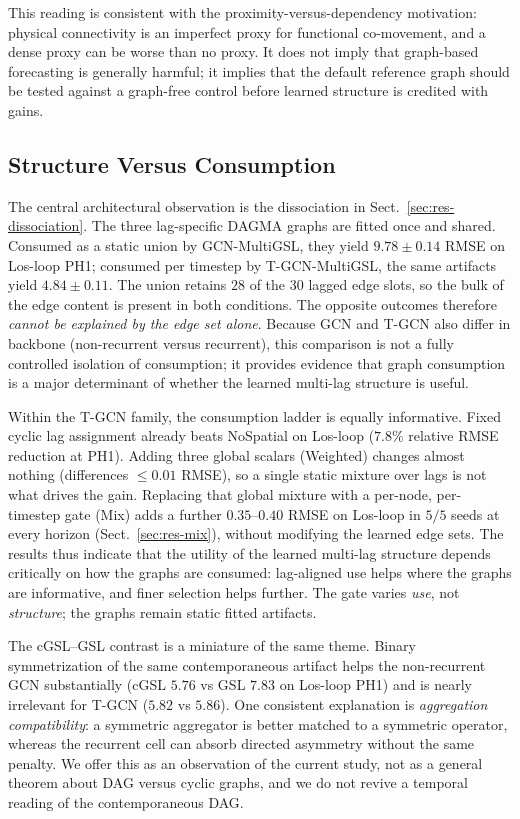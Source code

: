This reading is consistent with the proximity-versus-dependency motivation:
physical connectivity is an imperfect proxy for functional co-movement, and
a dense proxy can be worse than no proxy. It does not imply that
graph-based forecasting is generally harmful; it implies that the default
reference graph should be tested against a graph-free control before
learned structure is credited with gains.

\subsection{Structure Versus Consumption}\label{sec:disc-consumption}

The central architectural observation is the dissociation in
Sect.~\ref{sec:res-dissociation}. The three lag-specific DAGMA graphs are
fitted once and shared. Consumed as a static union by GCN-MultiGSL, they
yield $9.78\pm 0.14$ RMSE on Los-loop PH1; consumed per timestep by
T-GCN-MultiGSL, the same artifacts yield $4.84\pm 0.11$. The union retains
$28$ of the $30$ lagged edge slots, so the bulk of the edge content is
present in both conditions. The opposite outcomes therefore \emph{cannot be
explained by the edge set alone}. Because GCN and T-GCN also differ in
backbone (non-recurrent versus recurrent), this comparison is not a fully
controlled isolation of consumption; it provides evidence that graph
consumption is a major determinant of whether the learned multi-lag
structure is useful.

Within the T-GCN family, the consumption ladder is equally informative.
Fixed cyclic lag assignment already beats NoSpatial on Los-loop
($7.8\%$ relative RMSE reduction at PH1). Adding three global scalars
(Weighted) changes almost nothing (differences $\le 0.01$ RMSE), so a single
static mixture over lags is not what drives the gain. Replacing that global
mixture with a per-node, per-timestep gate (Mix) adds a further
$0.35$--$0.40$ RMSE on Los-loop in $5/5$ seeds at every horizon
(Sect.~\ref{sec:res-mix}), without modifying the learned edge sets. The
results thus indicate that the utility of the learned multi-lag structure
depends critically on how the graphs are consumed: lag-aligned use helps
where the graphs are informative, and finer selection helps further. The
gate varies \emph{use}, not \emph{structure}; the graphs remain static
fitted artifacts.

The cGSL--GSL contrast is a miniature of the same theme. Binary
symmetrization of the same contemporaneous artifact helps the non-recurrent
GCN substantially (cGSL $5.76$ vs GSL $7.83$ on Los-loop PH1) and is nearly
irrelevant for T-GCN ($5.82$ vs $5.86$). One consistent explanation is
\emph{aggregation compatibility}: a symmetric aggregator is better matched
to a symmetric operator, whereas the recurrent cell can absorb directed
asymmetry without the same penalty. We offer this as an observation of the
current study, not as a general theorem about DAG versus cyclic graphs, and
we do not revive a temporal reading of the contemporaneous DAG.

